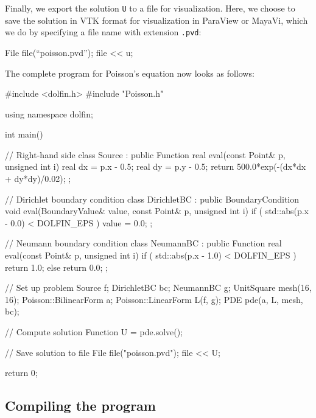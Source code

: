 Finally, we export the solution \texttt{U} to a file for
visualization. Here, we choose to save the solution in VTK format for
visualization in ParaView or MayaVi, which we do by specifying a file
name with extension \texttt{.pvd}:
\begin{code}
File file(``poisson.pvd'');
file << u;
\end{code}

The complete program for Poisson's equation now looks as follows:
\small
\begin{code}
#include <dolfin.h>
#include "Poisson.h"

using namespace dolfin;

int main()
{
  // Right-hand side                                                                                          
  class Source : public Function
  {
    real eval(const Point& p, unsigned int i)
    {
      real dx = p.x - 0.5;
      real dy = p.y - 0.5;
      return 500.0*exp(-(dx*dx + dy*dy)/0.02);
    }
  };

  // Dirichlet boundary condition                                                                             
  class DirichletBC : public BoundaryCondition
  {
    void eval(BoundaryValue& value, const Point& p, unsigned int i)
    {
      if ( std::abs(p.x - 0.0) < DOLFIN_EPS )
        value = 0.0;
    }
  };

  // Neumann boundary condition                                                                               
  class NeumannBC : public Function
  {
    real eval(const Point& p, unsigned int i)
    {
      if ( std::abs(p.x - 1.0) < DOLFIN_EPS )
        return 1.0;
      else
        return 0.0;
    }
  };

  // Set up problem                                                                                           
  Source f;
  DirichletBC bc;
  NeumannBC g;
  UnitSquare mesh(16, 16);
  Poisson::BilinearForm a;
  Poisson::LinearForm L(f, g);
  PDE pde(a, L, mesh, bc);

  // Compute solution                                                                                         
  Function U = pde.solve();

  // Save solution to file                                                                                    
  File file("poisson.pvd");
  file << U;

  return 0;
}
\end{code}
\normalsize

\subsection{Compiling the program}

